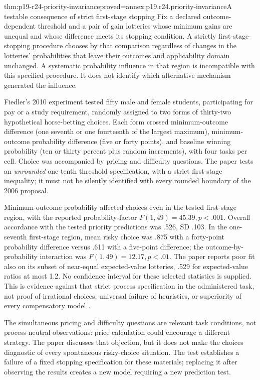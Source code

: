 \begin{hblemma}{thm:p19-r24-priority-invariance}{proved=annex:p19.r24.priority-invariance}{A testable consequence of strict first-stage stopping}
Fix a declared outcome-dependent threshold and a pair of gain
lotteries whose minimum gains are unequal and whose difference meets its stopping
condition. A strictly first-stage-stopping procedure chooses by
that comparison regardless of changes in the lotteries'
probabilities that leave their outcomes and applicability domain
unchanged. A systematic probability influence in that region is
incompatible with this specified procedure. It does not identify
which alternative mechanism generated the influence.
\end{hblemma}

Fiedler's 2010 experiment tested fifty male and female students,
participating for pay or a study requirement, randomly assigned
to two forms of thirty-two hypothetical horse-betting choices.
Each form crossed minimum-outcome difference (one seventh or
one fourteenth of the largest maximum), minimum-outcome
probability difference (five or forty points), and baseline
winning probability (ten or thirty percent plus random increments),
with four tasks per cell. Choice was accompanied by pricing and
difficulty questions. The paper tests an \emph{unrounded}
one-tenth threshold specification, with a strict first-stage
inequality; it must not be silently identified with every rounded
boundary of the 2006 proposal.

Minimum-outcome probability affected choices even in the
tested first-stage region, with the reported probability-factor
\(F(1,49)=45.39,p<.001\). Overall accordance with the tested
priority predictions was .526, SD .103. In the one-seventh first-stage
region, mean risky choice was .875 with a forty-point probability
difference versus .611 with a five-point difference; the
outcome-by-probability interaction was \(F(1,49)=12.17,p<.01\).
The paper reports poor fit also on its subset of near-equal
expected-value lotteries, .529 for expected-value ratios at most 1.2.
No confidence interval for these selected statistics is supplied.
This is evidence against that strict process specification in
the administered task, not proof of irrational choices, universal
failure of heuristics, or superiority of every compensatory model
\cite[pp.~22--27]{Fiedler2010PriorityProcess}.

The simultaneous pricing and difficulty questions are relevant task
conditions, not process-neutral observations: price calculation could
encourage a different strategy. The paper discusses that objection,
but it does not make the choices diagnostic of every spontaneous
risky-choice situation. The test establishes a failure of a fixed
stopping specification for these materials; replacing it after observing
the results creates a new model requiring a new prediction test.

